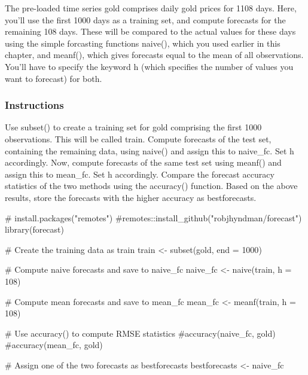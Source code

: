 \documentclass[
  letterpaper,
  DIV=11,
  numbers=noendperiod]{scrartcl}
\newenvironment{Shaded}{\begin{snugshade}}{\end{snugshade}}
\newcommand{\AttributeTok}[1]{\textcolor[rgb]{0.40,0.45,0.13}{#1}}
\newcommand{\CommentTok}[1]{\textcolor[rgb]{0.37,0.37,0.37}{#1}}
\newcommand{\DecValTok}[1]{\textcolor[rgb]{0.68,0.00,0.00}{#1}}
\newcommand{\FunctionTok}[1]{\textcolor[rgb]{0.28,0.35,0.67}{#1}}
\newcommand{\NormalTok}[1]{\textcolor[rgb]{0.00,0.23,0.31}{#1}}
\newcommand{\OtherTok}[1]{\textcolor[rgb]{0.00,0.23,0.31}{#1}}
\begin{document}
The pre-loaded time series gold comprises daily gold prices for 1108
days. Here, you'll use the first 1000 days as a training set, and
compute forecasts for the remaining 108 days. These will be compared to
the actual values for these days using the simple forcasting functions
naive(), which you used earlier in this chapter, and meanf(), which
gives forecasts equal to the mean of all observations. You'll have to
specify the keyword h (which specifies the number of values you want to
forecast) for both.

\hypertarget{instructions-6}{%
\subsubsection{Instructions}\label{instructions-6}}

Use subset() to create a training set for gold comprising the first 1000
observations. This will be called train. Compute forecasts of the test
set, containing the remaining data, using naive() and assign this to
naive\_fc. Set h accordingly. Now, compute forecasts of the same test
set using meanf() and assign this to mean\_fc. Set h accordingly.
Compare the forecast accuracy statistics of the two methods using the
accuracy() function. Based on the above results, store the forecasts
with the higher accuracy as bestforecasts.

\begin{Shaded}
\begin{Highlighting}[]
\CommentTok{\# install.packages("remotes")}
\CommentTok{\#remotes::install\_github("robjhyndman/forecast")}
\FunctionTok{library}\NormalTok{(forecast)}

\CommentTok{\# Create the training data as train}
\NormalTok{train }\OtherTok{\textless{}{-}} \FunctionTok{subset}\NormalTok{(gold, }\AttributeTok{end =} \DecValTok{1000}\NormalTok{)}

\CommentTok{\# Compute naive forecasts and save to naive\_fc}
\NormalTok{naive\_fc }\OtherTok{\textless{}{-}} \FunctionTok{naive}\NormalTok{(train, }\AttributeTok{h =} \DecValTok{108}\NormalTok{)}

\CommentTok{\# Compute mean forecasts and save to mean\_fc}
\NormalTok{mean\_fc }\OtherTok{\textless{}{-}} \FunctionTok{meanf}\NormalTok{(train, }\AttributeTok{h =} \DecValTok{108}\NormalTok{)}

\CommentTok{\# Use accuracy() to compute RMSE statistics}
\CommentTok{\#accuracy(naive\_fc, gold)}
\CommentTok{\#accuracy(mean\_fc, gold)}

\CommentTok{\# Assign one of the two forecasts as bestforecasts}
\NormalTok{bestforecasts }\OtherTok{\textless{}{-}}\NormalTok{ naive\_fc}
\end{Highlighting}
\end{Shaded}
\end{document}
